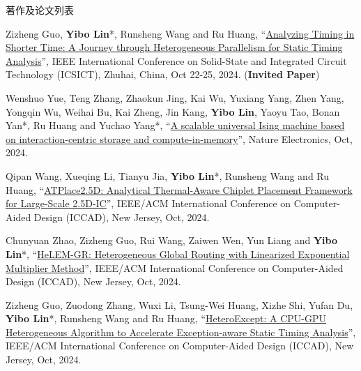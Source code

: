 \begin{rSection}{著作及论文列表}
\begin{description}[font=\normalfont, rightmargin=2em]
{}
            

\item[{[C166]}]{
        Zizheng Guo, \textbf{Yibo Lin}*, Runsheng Wang and Ru Huang, 
    ``\href{https://doi.org/10.1109/ICSICT62049.2024.10831648}{Analyzing Timing in Shorter Time: A Journey through Heterogeneous Parallelism for Static Timing Analysis}'', 
    IEEE International Conference on Solid-State and Integrated Circuit Technology (ICSICT), Zhuhai, China, Oct 22-25, 2024.
    (\textbf{Invited Paper})
}
            

\item[{[J165]}]{
        Wenshuo Yue, Teng Zhang, Zhaokun Jing, Kai Wu, Yuxiang Yang, Zhen Yang, Yongqin Wu, Weihai Bu, Kai Zheng, Jin Kang, \textbf{Yibo Lin}, Yaoyu Tao, Bonan Yan*, Ru Huang and Yuchao Yang*, 
    ``\href{https://doi.org/10.1038/s41928-024-01228-7}{A scalable universal Ising machine based on interaction-centric storage and compute-in-memory}'', 
    Nature Electronics, Oct, 2024.
    
}
            

\item[{[C164]}]{
        Qipan Wang, Xueqing Li, Tianyu Jia, \textbf{Yibo Lin}*, Runsheng Wang and Ru Huang, 
    ``\href{https://doi.org/10.1145/3676536.3676648}{ATPlace2.5D: Analytical Thermal-Aware Chiplet Placement Framework for Large-Scale 2.5D-IC}'', 
    IEEE/ACM International Conference on Computer-Aided Design (ICCAD), New Jersey, Oct, 2024.
    
}
            

\item[{[C163]}]{
        Chunyuan Zhao, Zizheng Guo, Rui Wang, Zaiwen Wen, Yun Liang and \textbf{Yibo Lin}*, 
    ``\href{https://doi.org/10.1145/3676536.3676650}{HeLEM-GR: Heterogeneous Global Routing with Linearized Exponential Multiplier Method}'', 
    IEEE/ACM International Conference on Computer-Aided Design (ICCAD), New Jersey, Oct, 2024.
    
}
            

\item[{[C162]}]{
        Zizheng Guo, Zuodong Zhang, Wuxi Li, Tsung-Wei Huang, Xizhe Shi, Yufan Du, \textbf{Yibo Lin}*, Runsheng Wang and Ru Huang, 
    ``\href{https://doi.org/10.1145/3676536.3676651}{HeteroExcept: A CPU-GPU Heterogeneous Algorithm to Accelerate Exception-aware Static Timing Analysis}'', 
    IEEE/ACM International Conference on Computer-Aided Design (ICCAD), New Jersey, Oct, 2024.
    
}
            


\end{description}
\end{rSection}
